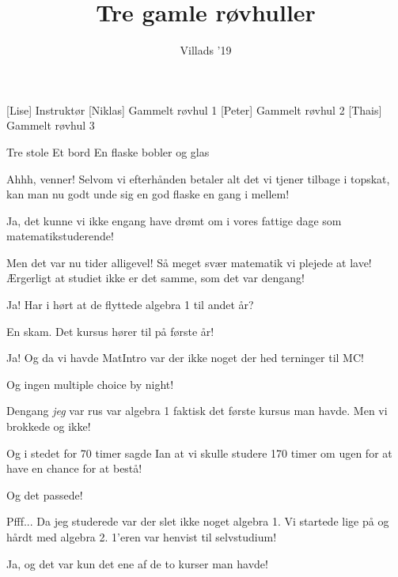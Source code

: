 \documentclass[a4paper,11pt]{article}
\title{Tre gamle røvhuller}
\author{Villads '19}
\begin{document}
\maketitle

\begin{roles}
[Lise] Instruktør
[Niklas] Gammelt røvhul 1
[Peter] Gammelt røvhul 2
[Thais] Gammelt røvhul 3
\end{roles}

\begin{props}
 Tre stole
 Et bord
 En flaske bobler og glas
\end{props}


\begin{sketch}

 Ahhh, venner! Selvom vi efterhånden betaler alt det vi tjener tilbage i topskat, kan man nu godt unde sig en god flaske en gang i mellem!

 Ja, det kunne vi ikke engang have drømt om i vores fattige dage som matematikstuderende!

 Men det var nu tider alligevel! Så meget svær matematik vi plejede at lave! Ærgerligt at studiet ikke er det samme, som det var dengang!


 Ja! Har i hørt at de flyttede algebra 1 til andet år?

 En skam. Det kursus hører til på første år!

 Ja! Og da vi havde MatIntro var der ikke noget der hed terninger til MC!

 Og ingen multiple choice by night!


 Dengang \emph{jeg} var rus var algebra 1 faktisk det første kursus man havde.  Men vi brokkede og ikke!

 Og i stedet for 70 timer sagde Ian at vi skulle studere 170 timer om ugen for at have en chance for at bestå!

 Og det passede!

 Pfff... Da jeg studerede var der slet ikke noget algebra 1. Vi startede lige på og hårdt med algebra 2. 1’eren var henvist til selvstudium!

 Ja, og det var kun det ene af de to kurser man havde!


\end{sketch}
\end{document}
